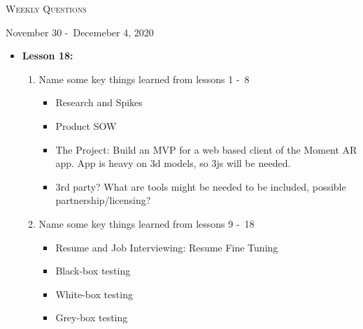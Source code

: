 \centerline{\LARGE\textsc{Weekly Questions}}
\centerline{November 30 -\ Decemeber 4, 2020}
\textbf{}
\begin{itemize}
  \item[] \textbf{\large Lesson 18:}
  \begin{enumerate}
    \item Name some key things learned from lessons 1 -\ 8
    \begin{itemize}
      \item Research and Spikes
      \item Product SOW
      \item The Project: Build an MVP for a web based client of the Moment AR app. App is heavy on 3d models, so 3js will be needed.
      \item 3rd party? What are tools might be needed to be included, possible partnership/licensing?
    \end{itemize}
    \item Name some key things learned from lessons 9 -\ 18
    \begin{itemize}
      \item Resume and Job Interviewing: Resume Fine Tuning
      \item Black-box testing
      \item White-box testing
      \item Grey-box testing
    \end{itemize}
  \end{enumerate}
\end{itemize}
